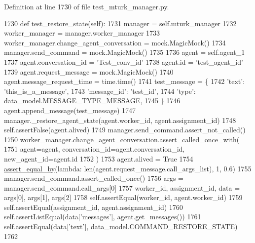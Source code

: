 Definition at line 1730 of file test\+\_\+mturk\+\_\+manager.\+py.


\begin{DoxyCode}
1730     \textcolor{keyword}{def }test\_restore\_state(self):
1731         manager = self.mturk\_manager
1732         worker\_manager = manager.worker\_manager
1733         worker\_manager.change\_agent\_conversation = mock.MagicMock()
1734         manager.send\_command = mock.MagicMock()
1735 
1736         agent = self.agent\_1
1737         agent.conversation\_id = \textcolor{stringliteral}{'Test\_conv\_id'}
1738         agent.id = \textcolor{stringliteral}{'test\_agent\_id'}
1739         agent.request\_message = mock.MagicMock()
1740         agent.message\_request\_time = time.time()
1741         test\_message = \{
1742             \textcolor{stringliteral}{'text'}: \textcolor{stringliteral}{'this\_is\_a\_message'},
1743             \textcolor{stringliteral}{'message\_id'}: \textcolor{stringliteral}{'test\_id'},
1744             \textcolor{stringliteral}{'type'}: data\_model.MESSAGE\_TYPE\_MESSAGE,
1745         \}
1746         agent.append\_message(test\_message)
1747         manager.\_restore\_agent\_state(agent.worker\_id, agent.assignment\_id)
1748         self.assertFalse(agent.alived)
1749         manager.send\_command.assert\_not\_called()
1750         worker\_manager.change\_agent\_conversation.assert\_called\_once\_with(
1751             agent=agent, conversation\_id=agent.conversation\_id, new\_agent\_id=agent.id
1752         )
1753         agent.alived = \textcolor{keyword}{True}
1754         \hyperlink{namespaceparlai_1_1mturk_1_1core_1_1test_1_1test__mturk__manager_a1fd7ac4fedefa65d2416601107dbe44c}{assert\_equal\_by}(\textcolor{keyword}{lambda}: len(agent.request\_message.call\_args\_list), 1, 0.6)
1755         manager.send\_command.assert\_called\_once()
1756         args = manager.send\_command.call\_args[0]
1757         worker\_id, assignment\_id, data = args[0], args[1], args[2]
1758         self.assertEqual(worker\_id, agent.worker\_id)
1759         self.assertEqual(assignment\_id, agent.assignment\_id)
1760         self.assertListEqual(data[\textcolor{stringliteral}{'messages'}], agent.get\_messages())
1761         self.assertEqual(data[\textcolor{stringliteral}{'text'}], data\_model.COMMAND\_RESTORE\_STATE)
1762 
\end{DoxyCode}
\mbox{\label{classparlai_1_1mturk_1_1core_1_1legacy__2018_1_1test_1_1test__mturk__manager_1_1TestMTurkManagerConnectedFunctions_a212e61425b5e01d4089a5d0cbb3971cc}} 
